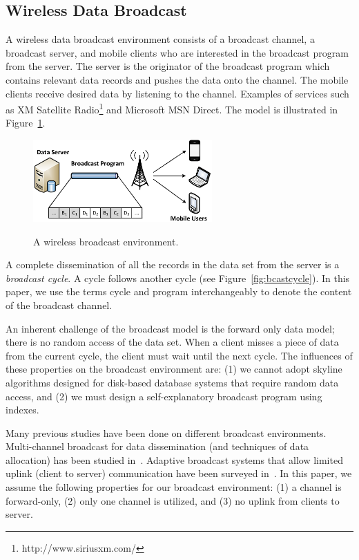 \subsection{Wireless Data Broadcast}\label{sec:wireless_broadcast}

A wireless data broadcast environment consists of a broadcast
channel, a broadcast server, and mobile clients who are interested
in the broadcast program from the server. The server is the
originator of the broadcast program which contains relevant data
records and pushes the data onto the channel. The mobile clients
receive desired data by listening to the channel. Examples of
services such as XM Satellite
Radio\footnote{http://www.siriusxm.com/} and Microsoft MSN Direct.
The model is illustrated in Figure~\ref{fig:broadcast}.

\begin{figure}[!t]
\begin{center}
\includegraphics[width=2.7in]{Figures/on_demand.eps}
\vspace*{-5pt} \caption{A wireless broadcast environment.}
\vspace*{-10pt} \label{fig:broadcast}
\end{center}
\end{figure}

A complete dissemination of all the records in the data set from
the server is a \emph{broadcast cycle}. A cycle follows another
cycle (see Figure~\ref{fig:bcastcycle}). In this paper, we use the
terms cycle and program interchangeably to denote the content of
the broadcast channel.

An inherent challenge of the broadcast model is the forward only
data model; there is no random access of the data set. When a
client misses a piece of data from the current cycle, the client
must wait until the next cycle. The influences of these properties
on the broadcast environment are: (1) we cannot adopt skyline
algorithms designed for disk-based database systems that require
random data access, and (2) we must design a self-explanatory
broadcast program using indexes.

Many previous studies have been done on different broadcast
environments. Multi-channel broadcast for data dissemination (and
techniques of data allocation) has been studied
in~\cite{conf/cikm/HsuLC01,conf/cikm/YeeN03,conf/mobicom/HameedV97}.
Adaptive broadcast systems that allow limited uplink (client to
server) communication have been surveyed
in~\cite{journals/pieee/Wong88}. In this paper, we assume the
following properties for our broadcast environment: (1) a channel
is forward-only, (2) only one channel is utilized, and (3) no
uplink from clients to server.

